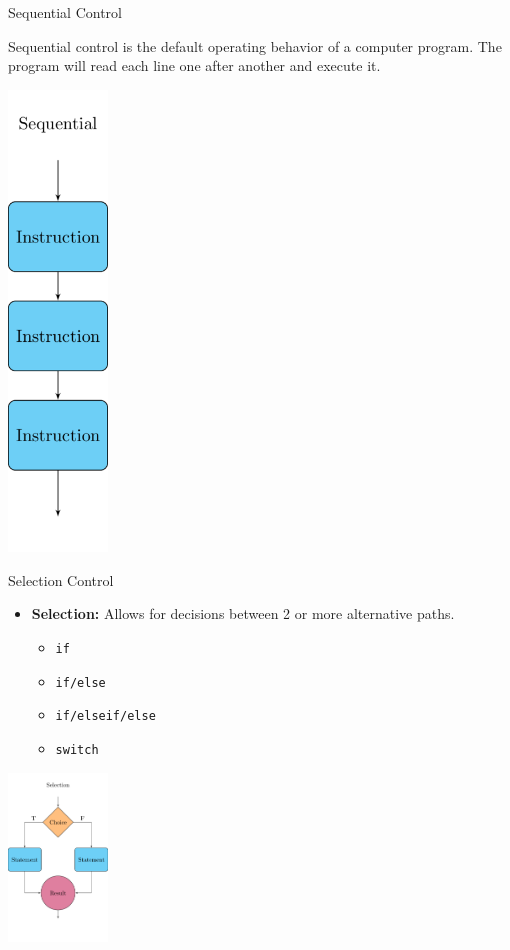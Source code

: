 \begin{frame}{Sequential Control}

Sequential control is the default operating behavior of a computer
program. The program will read each line one after another and execute
it.

\begin{center}\includegraphics[width=100px]{figures/sequential_diagram} \end{center}

\end{frame}

\begin{frame}[fragile]{Selection Control}

\begin{itemize}
\tightlist
\item
  \textbf{Selection:} Allows for decisions between 2 or more alternative
  paths.

  \begin{itemize}
  \tightlist
  \item
    \texttt{if}
  \item
    \texttt{if/else}
  \item
    \texttt{if/elseif/else}
  \item
    \texttt{switch}
  \end{itemize}
\end{itemize}

\begin{center}\includegraphics[width=100px]{figures/selection_diagram} \end{center}

\end{frame}

